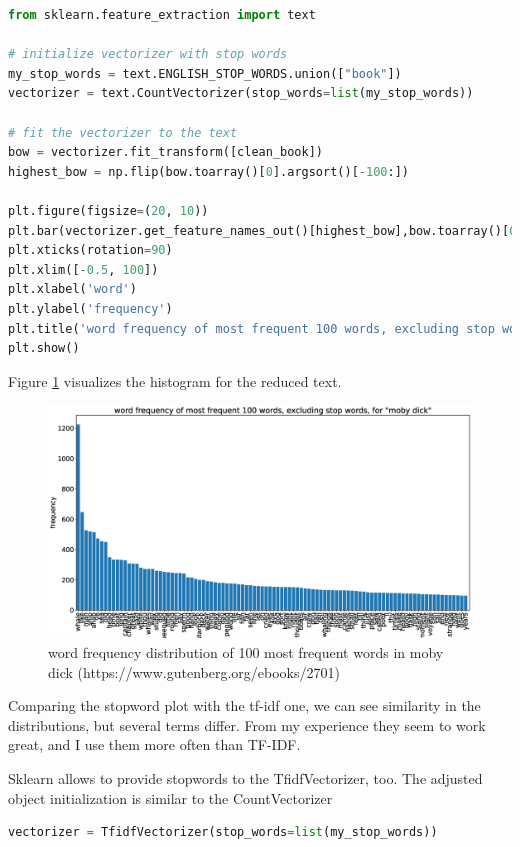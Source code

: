 \begin{lstlisting}[language=Python, caption={Reduced word-frequency histogram for Moby Dick excluding stop words.}, label={code:moby-stopwords}]
from sklearn.feature_extraction import text

# initialize vectorizer with stop words
my_stop_words = text.ENGLISH_STOP_WORDS.union(["book"])
vectorizer = text.CountVectorizer(stop_words=list(my_stop_words))

# fit the vectorizer to the text
bow = vectorizer.fit_transform([clean_book])
highest_bow = np.flip(bow.toarray()[0].argsort()[-100:])

plt.figure(figsize=(20, 10))
plt.bar(vectorizer.get_feature_names_out()[highest_bow],bow.toarray()[0][highest_bow])
plt.xticks(rotation=90)
plt.xlim([-0.5, 100])
plt.xlabel('word')
plt.ylabel('frequency')
plt.title('word frequency of most frequent 100 words, excluding stop words, for "moby dick"')
plt.show()
\end{lstlisting}
Figure \ref{fig:moby-stopwords} visualizes the histogram for the reduced text.
\begin{figure}[h]
  \centering
  \includegraphics[width=.95\textwidth]{images/moby-stopwords.eps}
  \caption{word frequency distribution of 100 most frequent words in moby dick (https://www.gutenberg.org/ebooks/2701)}
  \label{fig:moby-stopwords}
\end{figure}
Comparing the stopword plot with the tf-idf one, we can see similarity in the distributions, but several terms differ.
From my experience they seem to work great, and I use them more often than TF-IDF.

Sklearn allows to provide stopwords to the TfidfVectorizer, too. The adjusted object initialization is similar to the CountVectorizer
\begin{lstlisting}[language=Python, label={code:tfidf-stopwords}]
vectorizer = TfidfVectorizer(stop_words=list(my_stop_words))
\end{lstlisting}
